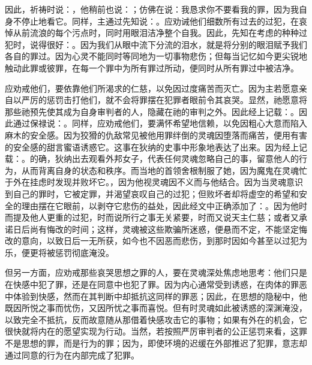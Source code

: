 因此，祈祷时说：，他稍前也说：；仿佛在说：我恳求你不要看我的罪，因为我自身不停止地看它。同样，主通过先知说：。应劝诫他们细数所有过去的过犯，在哀悼从前流浪的每个污点时，同时用眼泪洁净整个自我。因此，先知在考虑的种种过犯时，说得很好：。因为我们从眼中流下分流的泪水，就是将分别的眼泪赋予我们各自的罪过。因为心灵不能同时等同地为一切事物悲伤；但每当记忆如今更尖锐地触动此罪或彼罪，在每一个罪中为所有罪过所动，便同时从所有罪过中被洁净。\par

应劝戒他们，要依靠他们所渴求的仁慈，以免因过度痛苦而灭亡。因为主若愿意亲自以严厉的惩罚击打他们，就不会将罪摆在犯罪者眼前令其哀哭。显然，祂愿意将那些祂预先使其成为自身审判者的人，隐藏在祂的审判之外。因此经上记载：。因此通过保禄说：。同样，应劝戒他们，要满怀希望地信赖，以免因粗心大意而陷入麻木的安全感。因为狡猾的仇敌常见被他用罪绊倒的灵魂因堕落而痛苦，便用有害的安全感的甜言蜜语诱惑它。这事在狄纳的史事中形象地表达了出来。因为经上记载：。的确，狄纳出去观看外邦女子，代表任何灵魂忽略自己的事，留意他人的行为，从而背离自身的状态和秩序。而当地的首领舍根制服了她，因为魔鬼在灵魂忙于外在挂虑时发现并败坏它。，因为他视灵魂因不义而与他结合。因为当灵魂意识到自己的罪时，它被定罪，并渴望哀叹自己的过犯；但败坏者却将虚空的希望和安全的理由摆在它眼前，以剥夺它悲伤的益处，因此经文中正确添加了：。因为他时而提及他人更重的过犯，时而说所行之事无关紧要，时而又说天主仁慈；或者又承诺日后尚有悔改的时间；这样，灵魂被这些欺骗所迷惑，便悬而不定，不能坚定悔改的意向，以致日后一无所获，如今也不因恶而悲伤，到那时因如今甚至以过犯为乐，便更将被惩罚彻底淹没。\par

但另一方面，应劝戒那些哀哭思想之罪的人，要在灵魂深处焦虑地思考：他们只是在快感中犯了罪，还是在同意中也犯了罪。因为内心通常受到诱惑，在肉体的罪恶中体验到快感，然而在其判断中却抵抗这同样的罪恶；因此，在思想的隐秘中，他既因所悦之事而忧伤，又因所忧之事而喜悦。但有时灵魂如此被诱惑的深渊淹没，以致完全不抵抗，反而故意随从那借着快感攻击它的事物；如果有外在的机会，它很快就将内在的愿望实现为行动。当然，若按照严厉审判者的公正惩罚来看，这罪不是思想的罪，而是行为的罪；因为，即使环境的迟缓在外部推迟了犯罪，意志却通过同意的行为在内部完成了犯罪。\par

